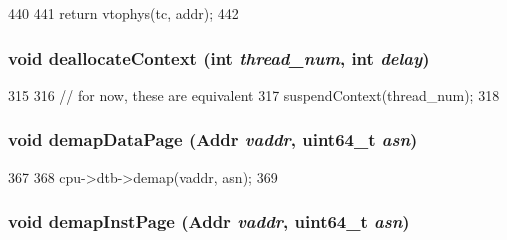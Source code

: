 \begin{DoxyCode}
440 {
441     return vtophys(tc, addr);
442 }
\end{DoxyCode}
\hypertarget{classOzoneCPU_a24e82fbf299a24c7cb6e2dd33f14e94d}{
\subsubsection[{deallocateContext}]{\setlength{\rightskip}{0pt plus 5cm}void deallocateContext (int {\em thread\_\-num}, \/  int {\em delay})}}
\label{classOzoneCPU_a24e82fbf299a24c7cb6e2dd33f14e94d}



\begin{DoxyCode}
315 {
316     // for now, these are equivalent
317     suspendContext(thread_num);
318 }
\end{DoxyCode}
\hypertarget{classOzoneCPU_a26789603cc94992d18f8ddedfff96acf}{
\subsubsection[{demapDataPage}]{\setlength{\rightskip}{0pt plus 5cm}void demapDataPage ({\bf Addr} {\em vaddr}, \/  uint64\_\-t {\em asn})}}
\label{classOzoneCPU_a26789603cc94992d18f8ddedfff96acf}



\begin{DoxyCode}
367     {
368         cpu->dtb->demap(vaddr, asn);
369     }
\end{DoxyCode}
\hypertarget{classOzoneCPU_ac8a36d45a839b07f50b73f1eee119615}{
\subsubsection[{demapInstPage}]{\setlength{\rightskip}{0pt plus 5cm}void demapInstPage ({\bf Addr} {\em vaddr}, \/  uint64\_\-t {\em asn})}}
\label{classOzoneCPU_ac8a36d45a839b07f50b73f1eee119615}



